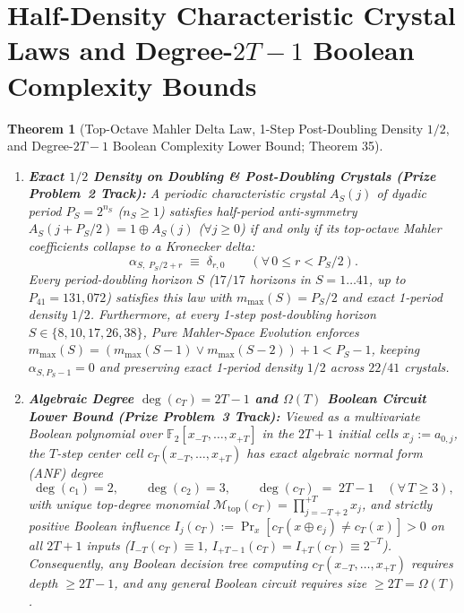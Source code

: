 \documentclass[11pt,a4paper]{article}
\newtheorem{theorem}{Theorem}[section]
\theoremstyle{definition}
\theoremstyle{remark}
\newcommand{\Ftwo}{\mathbb{F}_2}
\begin{document}
\section{Half-Density Characteristic Crystal Laws and Degree-\texorpdfstring{$2T-1$}{2T-1} Boolean Complexity Bounds}

\begin{theorem}[Top-Octave Mahler Delta Law, 1-Step Post-Doubling Density $1/2$, and Degree-$2T-1$ Boolean Complexity Lower Bound; Theorem 35]\label{thm:prize23}
\begin{enumerate}
  \item \textbf{Exact $1/2$ Density on Doubling \& Post-Doubling Crystals (Prize Problem~2 Track):} A periodic characteristic crystal $A_S(j)$ of dyadic period $P_S = 2^{n_S}$ ($n_S \ge 1$) satisfies half-period anti-symmetry $A_S(j + P_S/2) = 1 \oplus A_S(j)$ ($\forall j \ge 0$) if and only if its top-octave Mahler coefficients collapse to a Kronecker delta:
  \begin{equation}
    \alpha_{S,\; P_S/2 + r} \;\equiv\; \delta_{r, 0} \qquad (\forall\, 0 \le r < P_S/2).
  \end{equation}
  Every period-doubling horizon $S$ ($17/17$ horizons in $S = 1 \dots 41$, up to $P_{41} = 131{,}072$) satisfies this law with $m_{\max}(S) = P_S/2$ and exact 1-period density $1/2$. Furthermore, at every 1-step post-doubling horizon $S \in \{8, 10, 17, 26, 38\}$, Pure Mahler-Space Evolution enforces $m_{\max}(S) = (m_{\max}(S-1) \lor m_{\max}(S-2)) + 1 < P_S - 1$, keeping $\alpha_{S, P_S - 1} = 0$ and preserving exact 1-period density $1/2$ across $22/41$ crystals.
  \item \textbf{Algebraic Degree $\deg(c_T) = 2T - 1$ and $\Omega(T)$ Boolean Circuit Lower Bound (Prize Problem~3 Track):} Viewed as a multivariate Boolean polynomial over $\Ftwo[x_{-T},\dots,x_{+T}]$ in the $2T+1$ initial cells $x_j := a_{0,j}$, the $T$-step center cell $c_T(x_{-T},\dots,x_{+T})$ has exact algebraic normal form (ANF) degree
  \begin{equation}
    \deg(c_1) = 2, \qquad \deg(c_2) = 3, \qquad \deg(c_T) \;=\; 2T - 1 \quad (\forall\, T \ge 3),
  \end{equation}
  with unique top-degree monomial $\mathcal{M}_{\mathrm{top}}(c_T) = \prod_{j=-T+2}^{+T} x_j$, and strictly positive Boolean influence $I_j(c_T) := \Pr_x[c_T(x \oplus e_j) \ne c_T(x)] > 0$ on all $2T+1$ inputs ($I_{-T}(c_T) \equiv 1$, $I_{+T-1}(c_T) = I_{+T}(c_T) \equiv 2^{-T}$). Consequently, any Boolean decision tree computing $c_T(x_{-T},\dots,x_{+T})$ requires depth $\ge 2T - 1$, and any general Boolean circuit requires size $\ge 2T = \Omega(T)$.
\end{enumerate}
\end{theorem}
\end{document}
